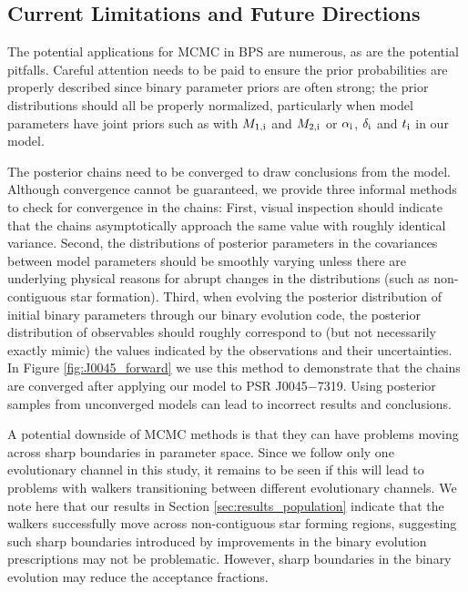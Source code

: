 \documentclass[usenatbib]{mnras}
\begin{document}
\subsection{Current Limitations and Future Directions}
\label{sec:limitations}


The potential applications for MCMC in BPS are numerous, as are the potential pitfalls. Careful attention needs to be paid to ensure the prior probabilities are properly described since binary parameter priors are often strong; the prior distributions should all be properly normalized, particularly when model parameters have joint priors such as with $M_{1,{\rm i}}$ and $M_{2,{\rm i}}$ or $\alpha_{\rm i}$, $\delta_{\rm i}$ and $t_{\rm i}$ in our model.


The posterior chains need to be converged to draw conclusions from the model. Although convergence cannot be guaranteed, we provide three informal methods to check for convergence in the chains: First, visual inspection should indicate that the chains asymptotically approach the same value with roughly identical variance. Second, the distributions of posterior parameters in the covariances between model parameters should be smoothly varying unless there are underlying physical reasons for abrupt changes in the distributions (such as non-contiguous star formation). Third, when evolving the posterior distribution of initial binary parameters through our binary evolution code, the posterior distribution of observables should roughly correspond to (but not necessarily exactly mimic) the values indicated by the observations and their uncertainties. In Figure \ref{fig:J0045_forward} we use this method to demonstrate that the chains are converged after applying our model to PSR J0045$-$7319. Using posterior samples from unconverged models can lead to incorrect results and conclusions.


A potential downside of MCMC methods is that they can have problems moving across sharp boundaries in parameter space. Since we follow only one evolutionary channel in this study, it remains to be seen if this will lead to problems with walkers transitioning between different evolutionary channels. We note here that our results in Section \ref{sec:results_population} indicate that the walkers successfully move across non-contiguous star forming regions, suggesting such sharp boundaries introduced by improvements in the binary evolution prescriptions may not be problematic. However, sharp boundaries in the binary evolution may reduce the acceptance fractions.
\end{document}
